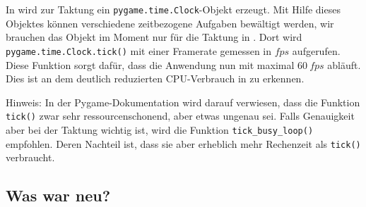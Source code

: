 In  wird zur Taktung ein \texttt{pygame.time.Clock}-Objekt erzeugt. Mit Hilfe dieses Objektes können verschiedene zeitbezogene Aufgaben bewältigt werden, wir brauchen das Objekt im Moment nur für die Taktung in . Dort wird \texttt{pygame.time.Clock.\-tick()} mit einer Framerate gemessen in $fps$ aufgerufen. Diese Funktion sorgt dafür, dass die Anwendung nun mit maximal $60~fps$ abläuft. Dies ist an dem deutlich reduzierten CPU-Verbrauch in  zu erkennen.

Hinweis: In der Pygame-Dokumentation wird darauf verwiesen, dass die Funktion \texttt{tick()} zwar sehr ressourcenschonend, aber etwas ungenau sei. Falls Genauigkeit aber bei der Taktung wichtig ist, wird die Funktion \texttt{tick\_busy\_loop()} empfohlen. Deren Nachteil ist, dass sie aber erheblich mehr Rechenzeit als \texttt{tick()} verbraucht.


\subsection*{Was war neu?}

